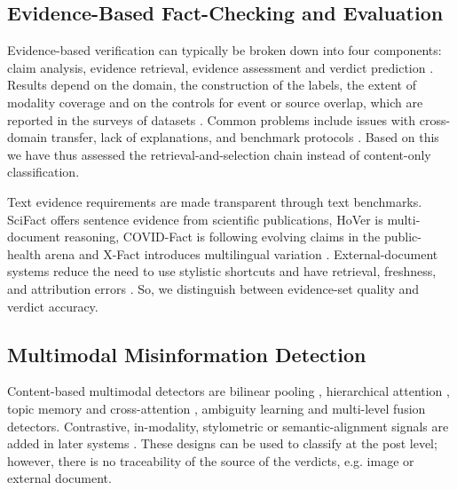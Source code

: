 \subsection{Evidence-Based Fact-Checking and Evaluation}

Evidence-based verification can typically be broken down into four components: claim analysis, evidence retrieval, evidence assessment and verdict prediction \cite{zeng2021automated,zhou2020survey,islam2020survey}. Results depend on the domain, the construction of the labels, the extent of modality coverage and on the controls for event or source overlap, which are reported in the surveys of datasets \cite{dulizia2021datasets,rastogi2022threet}. Common problems include issues with cross-domain transfer, lack of explanations, and benchmark protocols \cite{mridha2021review,aimeur2023review,lv2025survey}. Based on this we have thus assessed the retrieval-and-selection chain instead of content-only classification.

Text evidence requirements are made transparent through text benchmarks. SciFact offers sentence evidence from scientific publications, HoVer is multi-document reasoning, COVID-Fact is following evolving claims in the public-health arena and X-Fact introduces multilingual variation \cite{wadden2020scifact,jiang2020hover,saakyan2021covidfact,gupta2021xfact}. External-document systems reduce the need to use stylistic shortcuts and have retrieval, freshness, and attribution errors \cite{zhang2023realtime}. So, we distinguish between evidence-set quality and verdict accuracy.

\subsection{Multimodal Misinformation Detection}

Content-based multimodal detectors are bilinear pooling \cite{kumari2021amfb}, hierarchical attention \cite{meel2021han}, topic memory \cite{ying2021topicmemory} and cross-attention \cite{ying2021crossattention}, ambiguity learning \cite{chen2022cafe} and multi-level fusion \cite{jing2023mpfn} detectors. Contrastive, in-modality, stylometric or semantic-alignment signals are added in later systems \cite{yan2024fmc,zhu2024ifis,nadeem2023ssm,uppada2022imagetext}. These designs can be used to classify at the post level; however, there is no traceability of the source of the verdicts, e.g. image or external document.

